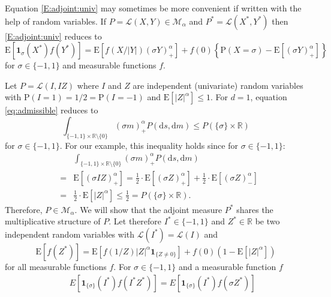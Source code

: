 \documentclass{aptpubarxiv}
\numberwithin{equation}{section}
\begin{document}
\begin{rem}
 Equation \eqref{E:adjoint:univ} may sometimes be more convenient if written with the help of random variables. If $P=\mathcal{L}(X,Y) \in \mathcal{M}_\alpha$ and $P^*=\mathcal{L}(X^*,Y^*)$ then \eqref{E:adjoint:univ} reduces to
 \begin{equation}\label{E:adjoint:univ:RV}{\mathrm{E}} [{\boldsymbol{1}}_{\sigma}(X^*)f(Y^*)]={\mathrm{E}}[f(X/|Y|)(\sigma Y)_+^\alpha]+f(0)\left\{{\mathrm{P}}(X=\sigma)-{\mathrm{E}}[(\sigma Y)_+^\alpha]\right\}
 \end{equation}
 for $\sigma \in \{-1,1\}$ and measurable functions $f$. 
\end{rem}

\begin{ex}
\label{Ex:adjoint:ARCH}
Let $P = {\mathcal{L}}(I, IZ)$ where $I$ and $Z$ are independent (univariate) random variables with ${\mathrm{P}}(I = 1) = 1/2 = {\mathrm{P}}(I = -1)$ and ${\mathrm{E}} [ |Z|^\alpha ] \leq 1$. For $d=1$, equation \eqref{eq:admissible} reduces to
$$\int_{\{-1,1\} \times \mathbb{R}\setminus\{0\}} (\sigma m)_+^\alpha P({\mathrm{d}s}, {\mathrm{d}m}) \leq P(\{\sigma\} \times \mathbb{R}) $$
for $\sigma \in \{-1,1\}$. For our example, this inequality holds since for $\sigma \in \{-1,1\}$:
\begin{eqnarray}
&&\nonumber \int_{\{-1,1\} \times \mathbb{R}\setminus\{0\}} (\sigma m)_+^\alpha P({\mathrm{d}s}, {\mathrm{d}m})\\
&=&\nonumber {\mathrm{E}}[(\sigma IZ)_+^\alpha]=\frac{1}{2}\cdot{\mathrm{E}}[(\sigma Z)_+^\alpha]+\frac{1}{2}\cdot{\mathrm{E}}[(\sigma Z)_-^\alpha] \\
&=&\label{E:Ex3.1:admissible} \frac{1}{2}\cdot{\mathrm{E}}[|Z|^\alpha] \leq \frac{1}{2}=P(\{\sigma\} \times \mathbb{R}).
\end{eqnarray}
Therefore, $P \in \mathcal{M}_\alpha$. We will show that the adjoint measure $P^*$ shares the multiplicative structure of $P$. Let therefore $I^\ast \in \{-1,1\}$ and $Z^\ast \in \mathbb{R}$ be two independent random variables with $\mathcal{L}(I^\ast)=\mathcal{L}(I)$ and 
\begin{equation}\label{E:backward:mult}{\mathrm{E}}[f(Z^*)]= {\mathrm{E}}[f(1/Z)|Z|^\alpha{\boldsymbol{1}}_{\{Z \neq 0\}}]+f(0)(1-{\mathrm{E}}[|Z|^\alpha])
\end{equation}
for all measurable functions $f$. For $\sigma \in \{-1,1\}$ and a measurable function $f$
\begin{eqnarray*}
&& E[{\boldsymbol{1}}_{\{\sigma\}}(I^\ast)f(I^\ast Z^\ast)]=E[{\boldsymbol{1}}_{\{\sigma\}}(I^\ast)f(\sigma Z^\ast)]\\

\end{eqnarray*}
\end{ex}
\end{document}
